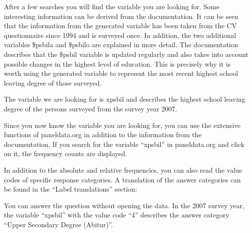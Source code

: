 \documentclass[letterpaper,10pt,openany,onesideH,english]{sphinxmanual}
\begin{document}
\begin{figure}[H]
\centering

\noindent{}
\end{figure}

After a few searches you will find the variable you are looking for. Some interesting information can be derived from the documentation. It can be seen that the information from the generated variable has been taken from the CV questionnaire since 1994 and is surveyed once. In addition, the two additional variables \$psbila and \$psbilo are explained in more detail. The documentation describes that the \$psbil variable is updated regularly and also takes into account possible changes in the highest level of education. This is precisely why it is worth using the generated variable to represent the most recent highest school leaving degree of those surveyed.

The variable we are looking for is xpsbil and describes the highest school leaving degree of the persons surveyed from the survey year 2007.


Since you now know the variable you are looking for, you can use the extensive functions of paneldata.org in addition to the information from the documentation. If you search for the variable “xpsbil” in paneldata.org and click on it, the frequency counts are displayed.

\begin{figure}[H]
\centering

\noindent{}
\end{figure}

In addition to the absolute and relative frequencies, you can also read the value codes of specific response categories. A translation of the answer categories can be found in the “Label translations” section:

\begin{figure}[H]
\centering

\noindent{}
\end{figure}

You can answer the question without opening the data. In the 2007 survey year, the variable “xpsbil” with the value code “4” describes the answer category “Upper Secondary Degree (Abitur)”.
\end{document}
